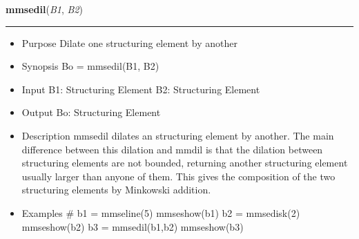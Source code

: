     \begin{boxedminipage}{\textwidth}

    \raggedright \textbf{mmsedil}(\textit{B1}, \textit{B2})

    \vspace{-1.5ex}

    \rule{\textwidth}{0.5\fboxrule}
    \begin{itemize}
    \setlength{\parskip}{0.6ex}
      \item Purpose Dilate one structuring element by another

      \item Synopsis Bo = mmsedil(B1, B2)

      \item Input B1: Structuring Element B2: Structuring Element

      \item Output Bo: Structuring Element

      \item Description mmsedil dilates an structuring element by another. 
        The main difference between this dilation and mmdil is that the 
        dilation between structuring elements are not bounded, returning 
        another structuring element usually larger than anyone of them. 
        This gives the composition of the two structuring elements by 
        Minkowski addition.

      \item Examples \# b1 = mmseline(5) mmseshow(b1) b2 = mmsedisk(2) 
        mmseshow(b2) b3 = mmsedil(b1,b2) mmseshow(b3)

    \end{itemize}

    \vspace{1ex}

    \end{boxedminipage}

    \label{multireg:num_pymorph:mmsedisk}
    \vspace{0.5ex}

